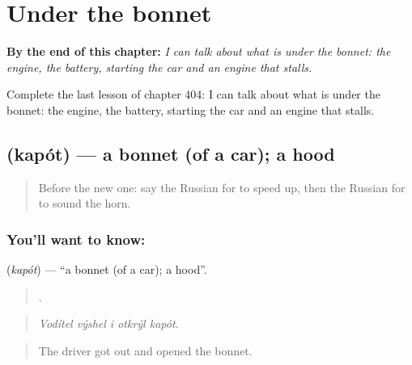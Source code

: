 
\chapter{Under the bonnet}
\label{ch:ru-under-the-bonnet}

\begin{chapteropening}
\textbf{By the end of this chapter:} \emph{I can talk about what is under the bonnet: the engine, the battery, starting the car and an engine that stalls.}

Complete the last lesson of chapter 404: I can talk about what is under the bonnet: the engine, the battery, starting the car and an engine that stalls.
\end{chapteropening}

\section[\texorpdfstring{\ru{капот} (kapót)}{капот (kapót)}]{ (kapót) — a bonnet (of a car); a hood}

\label{lesson:RU-C404-kapot}



\begin{quote}
Before the new one: say the Russian for to speed up, then the Russian for to sound the horn.
\end{quote}

\subsection*{You'll want to know: }
\textbf{} (\emph{kapót}) — \textquotedblleft{}a bonnet (of a car); a hood\textquotedblright{}.

\begin{quote}
    .
\end{quote}

\begin{quote}
\emph{Vodítel výshel i otkrýl kapót.}
\end{quote}

\begin{quote}
The driver got out and opened the bonnet.
\end{quote}

